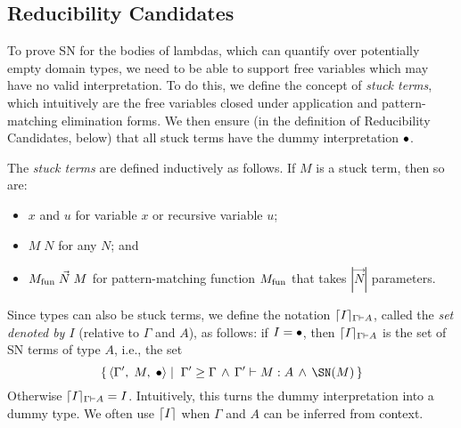 \documentclass{article}
\begin{document}





\subsection{Reducibility Candidates}
\label{subsec:reducibility-candidates}

To prove SN for the bodies of lambdas, which can
quantify over potentially empty domain types, we need to be able to support
free variables which may have no valid interpretation. To do this, we
define the concept of \emph{stuck terms}, which intuitively are the
free variables closed under application and pattern-matching
elimination forms. We then ensure (in the definition of Reducibility
Candidates, below) that all stuck terms have the dummy interpretation
$\dummy$.

\begin{definition}
  \label{def:stuck}
  The \emph{stuck terms} are defined inductively as follows. If $M$
  is a stuck term, then so are:
  \begin{itemize}
  \item $x$ and $u$ for variable $x$ or recursive variable $u$;
  \item $M\;N$ for any $N$; and
  \item $\Mfun\;\vec{N}\;M$ for pattern-matching function $\Mfun$
    that takes $|\vec{N}|$ parameters.
  \end{itemize}
\end{definition}


Since types can also be stuck terms, we define the notation
$\denotation{\Gamma}{A}{I}$, called the \emph{set denoted by $I$}
(relative to $\Gamma$ and $A$), as follows: if $I=\dummy$,
then $\denotation{\Gamma}{A}{I}$ is the set of SN terms
of type $A$, i.e., the set
\[
\setcompr{\triple{\Gamma'}{M}{\dummy}}{\Gamma'\geq\Gamma \mywedge \typej[\Gamma']{M}{A} \mywedge \SN(M)}
\]
Otherwise $\denotation{\Gamma}{A}{I}=I$. Intuitively, this turns the
dummy interpretation into a dummy type.  We often use
$\denotationnot{I}$ when $\Gamma$ and $A$ can be inferred from
context.
\end{document}
